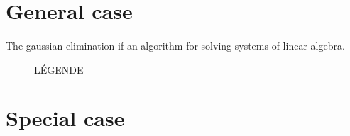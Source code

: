 \documentclass[a4paper, twoside, 11pt]{report}
\theoremstyle{theorem}
\theoremstyle{remark}
\theoremstyle{exemple}
\begin{document}
	\section{General case}
	
		\paragraph{}The gaussian elimination if an algorithm for solving systems of linear algebra.
		
		\begin{figure}[htbp]
       		\begin{center}
         		
       		\end{center}
       		\caption{LÉGENDE}
     	\end{figure}
	
	\section{Special case}	


	
				
\end{document}
